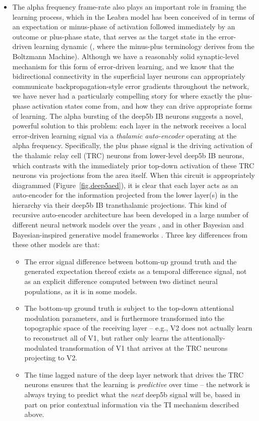 \documentclass[11pt,twoside]{article}
\newif\myifpdf
\begin{document}
\begin{itemize}
\item The alpha frequency frame-rate also plays an important role in framing the learning process, which in the Leabra model has been conceived of in terms of an expectation or minus-phase of activation followed immediately by an outcome or plus-phase state, that serves as the target state in the error-driven learning dynamic (, where the minus-plus terminology derives from the Boltzmann Machine).  Although we have a reasonably solid synaptic-level mechanism for this form of error-driven learning, and we know that the bidirectional connectivity in the superficial layer neurons can appropriately communicate backpropagation-style error gradients throughout the network, we have never had a particularly compelling story for where exactly the plus-phase activation states come from, and how they can drive appropriate forms of learning.  The alpha bursting of the deep5b IB neurons suggests a novel, powerful solution to this problem: each layer in the network receives a local error-driven learning signal via a {\em thalamic auto-encoder} operating at the alpha frequency.  Specifically, the plus phase signal is the driving activation of the thalamic relay cell (TRC) neurons from lower-level deep5b IB neurons, which contrasts with the immediately prior top-down activation of these TRC neurons via projections from the area itself.  When this circuit is appropriately diagrammed (Figure~\ref{fig.deep5aed}), it is clear that each layer acts as an auto-encoder for the information projected from the lower layer(s) in the hierarchy via their deep5b IB transthalamic projections.  This kind of recursive auto-encoder architecture has been developed in a large number of different neural network models over the years \cite{Pollack90,DayanHintonNealEtAl95,HintonSalakhutdinov06}, and in other Bayesian and Bayesian-inspired generative model frameworks \cite[e.g.,]{LeeMumford03,Friston05}.  Three key differences from these other models are that:

\begin{itemize}
\item The error signal difference between bottom-up ground truth and the generated expectation thereof exists as a temporal difference signal, not as an explicit difference computed between two distinct neural populations, as it is in some models.
\item The bottom-up ground truth is subject to the top-down attentional modulation parameters, and is furthermore transformed into the topographic space of the receiving layer -- e.g., V2 does not actually learn to reconstruct all of V1, but rather only learns the attentionally-modulated transformation of V1 that arrives at the TRC neurons projecting to V2.
\item The time lagged nature of the deep layer network that drives the TRC neurons ensures that the learning is {\em predictive} over time -- the network is always trying to predict what the {\em next} deep5b signal will be, based in part on prior contextual information via the TI mechanism described above.
\end{itemize}


\end{itemize}
\end{document}

